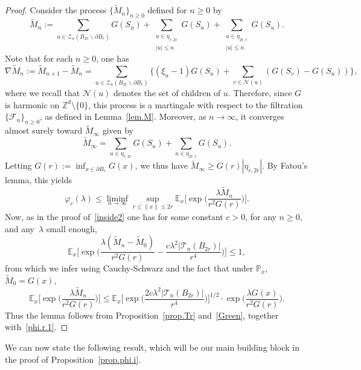\documentclass[JEP,XML,SOM,Unicode,NoFloatCountersInSection,published]{cedram}
\theoremstyle{plain}
\theoremstyle{definition}
\newcommand{\1}{{\text{\Large $\mathfrak 1$}}}
\let\bs\backslash
\begin{document}
\begin{proof}
Consider the process $\{\widetilde M_n\}_{n\ge 0}$
defined for $n\ge 0$ by
\begin{equation*}
\widetilde M_n := \sum_{u\in \mathcal Z_n(B_{2r}\bs \partial B_r)} G(S_u) +
\sum_{\substack{u\in \eta_{r,2r}\\ |u|\le n}}G(S_u)+
\sum_{\substack{u\in \eta_{2r,r}\\ |u|\le n}} G(S_u).
\end{equation*}
Note that for each $n\ge 0$, one has
\[
\nabla \widetilde M_n:= \widetilde M_{n+1}- \widetilde M_n =
\sum_{u\in \mathcal Z_n(B_{2r}\bs \partial B_r)}
\Big\{(\xi_u-1)G(S_u) + \sum_{v\in \mathcal N(u)}(G(S_v) - G(S_u))\Big\},
\]
where we recall that $\mathcal N(u)$ denotes the set of children of $u$.
Therefore, since $G$ is harmonic on $\mathbb Z^d\setminus \{0\}$, this process is a martingale with respect to the filtration
$\{\mathcal F_n\}_{n\ge 0}$, as defined in Lemma~\ref{lem.M}.
Moreover, as $n\to \infty$, it converges almost surely toward $\widetilde M_\infty$ given by
\begin{equation*}
\widetilde M_\infty = \sum_{u\in \eta_{r,2r}} G(S_u) + \sum_{u\in \eta_{2r,r}} G(S_u).
\end{equation*}
Letting $G(r):= \inf_{x\in \partial B_r} G(x)$, we thus have
$\widetilde M_\infty \ge G(r) |\eta_{r,2r}|$.
By Fatou's lemma, this yields
\begin{equation}\label{phi.r.1}
\varphi_r(\lambda) \le \liminf_{n\to \infty}\sup_{r\le \|x\|\le 2r}
\mathbb E_x\Big[\exp\Big(\frac{\lambda \widetilde M_n}{r^2G(r)}\Big)\Big].
\end{equation}
Now, as in the proof of~\eqref{inside2} one has for some constant $c>0$, for any $n\ge 0$, and any~$\lambda$ small enough,
\[
\mathbb E_x\Big[\exp\Big(\frac{\lambda (\widetilde M_n-\widetilde M_0)}
{r^2G(r)} - \frac{c\lambda^2|\mathcal T_n(B_{2r})|}{r^4}\Big)\Big] \le 1,
\]
from which we infer using Cauchy-Schwarz and the fact that under $\mathbb P_x$,
$\widetilde M_0=G(x)$,
\begin{equation*}
\mathbb E_x\Big[\exp\Big(\frac{\lambda \widetilde M_n}{r^2G(r)}\Big)\Big]
\le \mathbb E_x\Big[\exp\Big(\frac{2c\lambda^2
|\mathcal T_n(B_{2r})|}{r^4}\Big)\Big]^{1/2}
\cdot \exp\Big(\frac{\lambda G(x)}{r^2G(r)}\Big).
\end{equation*}
Thus the lemma follows from Proposition~\ref{prop.Tr} and~\eqref{Green}, together with~\eqref{phi.r.1}.
\end{proof}
We can now state the following result,
which will be our main building block in the proof of Proposition~\ref{prop.phi.i}.
\end{document}

